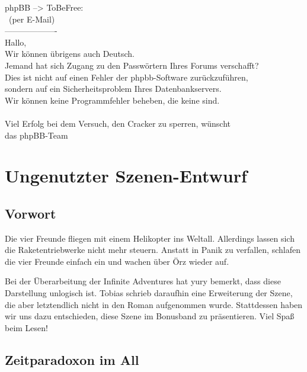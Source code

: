 \noindent \parbox{\textwidth}{

    \begin{footnotesize}
    \begin{itshape}

\noindent phpBB --> ToBeFree:\\
\noindent ~(per E-Mail)\\
\noindent -------------------\\
\noindent Hallo,\\
\noindent Wir können übrigens auch Deutsch.\\
\noindent Jemand hat sich Zugang zu den Passwörtern Ihres Forums verschafft?\\
\noindent Dies ist nicht auf einen Fehler der phpbb-Software zurückzuführen,\\
\noindent sondern auf ein Sicherheitsproblem Ihres Datenbankservers.\\
\noindent Wir können keine Programmfehler beheben, die keine sind.\\
\noindent ~\\
\noindent Viel Erfolg bei dem Versuch, den Cracker zu sperren, wünscht\\
\noindent das phpBB-Team\\

    \end{itshape}
    \end{footnotesize}

}


\chapter{Ungenutzter Szenen-Entwurf}

\section{Vorwort}
Die vier Freunde fliegen mit einem Helikopter ins Weltall. Allerdings lassen sich die Raketentriebwerke nicht mehr steuern. Anstatt in Panik zu verfallen, schlafen die vier Freunde einfach ein und wachen über Örz wieder auf.

Bei der Überarbeitung der Infinite Adventures hat yury bemerkt, dass diese Darstellung unlogisch ist. Tobias schrieb daraufhin eine Erweiterung der Szene, die aber letztendlich nicht in den Roman aufgenommen wurde. Stattdessen haben wir uns dazu entschieden, diese Szene im Bonusband zu präsentieren. Viel Spaß beim Lesen!

\section{Zeitparadoxon im All}

